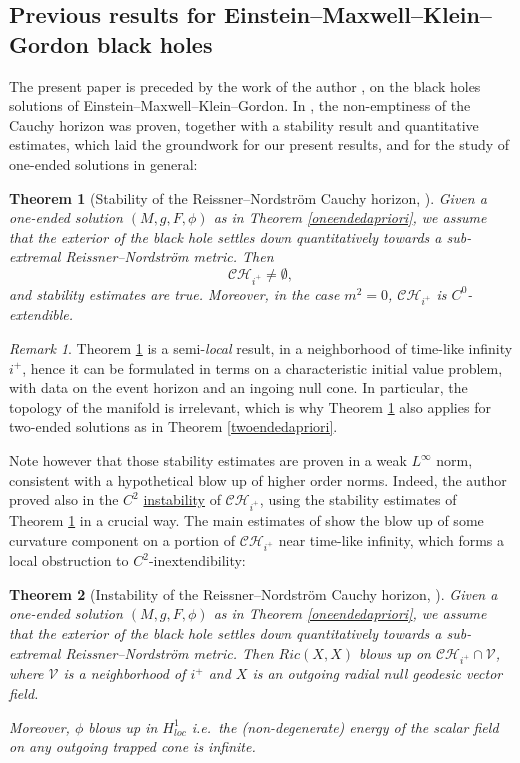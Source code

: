 \documentclass[10pt,a4paper]{article}
\theoremstyle{plain}
\newtheorem{thm}{Theorem}[section]
\theoremstyle{remark}
\newtheorem{rmk}{Remark}[section]
\theoremstyle{definition}
\theoremstyle{plain}
\theoremstyle{remark}
\theoremstyle{definition}
\newcommand{\CH}{\mathcal{CH}_{i^+}}
\numberwithin{equation}{section}
\begin{document}
\subsection{Previous results for Einstein--Maxwell--Klein--Gordon black holes}	\label{mypreviouswork}

The present paper is preceded by the work of the author \cite{Moi}, \cite{MoiThesis} on the black holes solutions of Einstein--Maxwell--Klein--Gordon. In \cite{Moi}, the non-emptiness of the Cauchy horizon was proven, together with a stability result and quantitative estimates, which laid the groundwork for our present results, and for the study of one-ended solutions in general: \begin{thm}[Stability of the Reissner--Nordstr\"{o}m Cauchy horizon, \cite{Moi}] \label{C0stab} Given a one-ended solution $(M,g,F,\phi)$ as in Theorem \ref{oneendedapriori}, we assume that the exterior of the black hole settles down quantitatively towards a sub-extremal Reissner--Nordstr\"{o}m metric. Then $$\CH \neq \emptyset,$$ and stability estimates are true.
	Moreover, in the case $m^2=0$, $\CH$ is $C^0$-extendible. \end{thm} \begin{rmk}
	Theorem \ref{C0stab} is a semi-\textit{local} result, in a neighborhood of time-like infinity $i^+$, hence it can be formulated in terms on a characteristic initial value problem, with data on the event horizon and an ingoing null cone. In particular, the topology of the manifold is irrelevant, which is why Theorem \ref{C0stab} also applies for two-ended solutions as in Theorem \ref{twoendedapriori}.
\end{rmk}

Note however that those stability estimates are proven in a weak $L^{\infty}$ norm, consistent with a hypothetical blow up of higher order norms. Indeed, the author proved also in \cite{Moi} the $C^2$ \underline{instability} of $\CH$, using the stability estimates of Theorem \ref{C0stab} in a crucial way. The main estimates of \cite{Moi} show the blow up of some curvature component on a portion of $\CH$ near time-like infinity, which forms a local obstruction to $C^2$-inextendibility:

\begin{thm}[Instability of the Reissner--Nordstr\"{o}m Cauchy horizon, \cite{Moi}] \label{C2instab}  Given a one-ended solution $(M,g,F,\phi)$ as in Theorem \ref{oneendedapriori}, we assume that the exterior of the black hole settles down quantitatively towards a sub-extremal Reissner--Nordstr\"{o}m metric. Then $Ric(X,X)$ blows up on $\CH \cap \mathcal{V}$, where $\mathcal{V}$ is a neighborhood of $i^+$ and $X$ is an outgoing radial null geodesic vector field.	
	
	Moreover, $\phi$ blows up in $H^1_{loc}$ i.e.\ the (non-degenerate) energy of the scalar field on any outgoing trapped cone is infinite. \end{thm}
\end{document}
